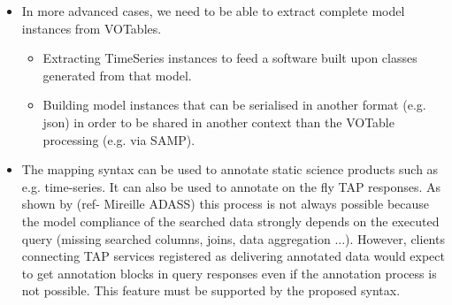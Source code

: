 \begin{itemize}
  \item In more advanced cases, we need to be able to extract complete model instances from VOTables.
    \begin{itemize}
      \item Extracting  TimeSeries instances to feed a software built upon classes generated from that model.
      \item Building model instances that can be serialised in another format (e.g. json) in order to be shared in another context than the VOTable processing (e.g. via SAMP).
   \end{itemize}         
    
   \item The mapping syntax can be used to annotate static science products such as e.g. time-series. It can also be used to annotate on the fly TAP responses.
   As shown by (ref- Mireille ADASS) this process is not always possible because the model compliance of the searched data strongly depends on the executed query (missing searched columns, joins, data aggregation ...). 
   However, clients connecting TAP services registered as delivering annotated data would expect to get annotation blocks in query responses even if the annotation process is not possible. 
   This feature must be supported by the proposed syntax.
    
\end{itemize} 

